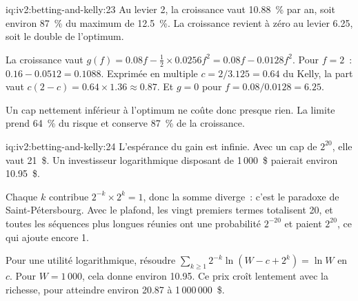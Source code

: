 \begin{solution}{iq:iv2:betting-and-kelly:23}
Au levier 2, la croissance vaut 10.88~\% par an, soit environ 87~\% du maximum de 12.5~\%. La croissance revient à zéro au levier 6.25, soit le double de l'optimum.

La croissance vaut $g(f) = 0.08f - \tfrac12 \times 0.0256f^2 = 0.08f - 0.0128f^2$. Pour $f = 2$~: $0.16 - 0.0512 = 0.1088$. Exprimée en multiple $c = 2/3.125 = 0.64$ du Kelly, la part vaut $c(2 - c) = 0.64 \times 1.36 \approx 0.87$. Et $g = 0$ pour $f = 0.08/0.0128 = 6.25$.

Un cap nettement inférieur à l'optimum ne coûte donc presque rien. La limite prend 64~\% du risque et conserve 87~\% de la croissance.

\end{solution}

\begin{solution}{iq:iv2:betting-and-kelly:24}
L'espérance du gain est infinie. Avec un cap de $2^{20}$, elle vaut 21~\$. Un investisseur logarithmique disposant de 1\,000~\$ paierait environ 10.95~\$.

Chaque $k$ contribue $2^{-k} \times 2^k = 1$, donc la somme diverge~: c'est le paradoxe de Saint-Pétersbourg. Avec le plafond, les vingt premiers termes totalisent 20, et toutes les séquences plus longues réunies ont une probabilité $2^{-20}$ et paient $2^{20}$, ce qui ajoute encore 1.

Pour une utilité logarithmique, résoudre $\sum_{k \geq 1}2^{-k}\ln(W - c + 2^k) = \ln W$ en $c$. Pour $W = 1\,000$, cela donne environ 10.95. Ce prix croît lentement avec la richesse, pour atteindre environ 20.87 à 1\,000\,000~\$.

\end{solution}

